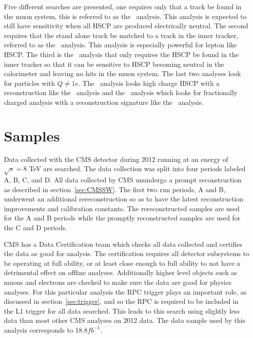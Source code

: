 Five different searches are presented, one requires only that a track be found in the muon system, this is referred to as the \muononly\ analysis. 
This analysis is expected to still have sensitivity when all HSCP are produced electrically neutral. The
second requires that the stand alone track be matched to a track in the inner tracker, referred to as the \tktof\ analysis. This analysis is especially
powerful for lepton like HSCP. The third is the \tkonly\ analysis that only requires the HSCP be found in the inner tracker so that it can be sensitive to HSCP
becoming neutral in the calorimeter and leaving no hits in the muon system. The last two analyses look for particles with $Q \neq 1e$.
The \multi\ analysis looks high charge HSCP with a reconstruction like the \tktof\ analysis and the \fract\ analysis which looks for fractionally charged analysis with
a reconstruction signature like the \tkonly\ analysis.

\section{Samples}

Data collected with the CMS detector during 2012 running at an energy of $\sqrt{s}=8$ TeV are searched. The data collection was split into four periods labeled A, B, C, and D.
All data collected by CMS unundergo a prompt reconstruction as described in section~\ref{sec:CMSSW}. The first two run periods, A and B, underwent an additional
rereconstruction so as to have the latest reconstruction improvements and calibration constants. The rereconstructed samples are used for the A and B periods while the promptly
reconstructed samples are used for the C and D periods.

CMS has a Data Certification team which checks all data collected and certifies the data as good for analysis. The certification requires all detector subsystems to be
operating at full ability, or at least close enough to full ability to not have a detrimental effect on offline analyses. Additionally higher level objects such as muons
and electrons are checked to make sure the data are good for physics analyses. For this particular analysis the RPC trigger plays an important role, as discussed in
section~\ref{sec:trigger}, and so the RPC is required to be included in the L1 trigger for all data searched. This leads to this search using slightly less data
than most other CMS analyses on 2012 data. The data sample used by this analysis corresponds to 18.8$fb^{-1}$.

